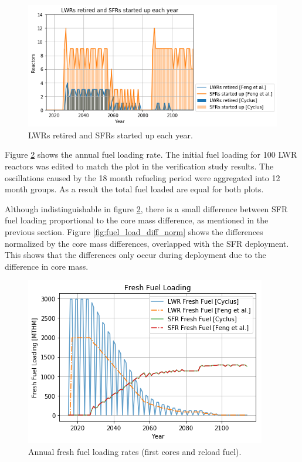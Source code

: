 \begin{figure}[htbp!]
	\begin{center}
		\includegraphics[scale=0.5]{./images/results_18/dep.png}
	\end{center}
	\caption{\glspl{LWR} retired and \glspl{SFR} started up each year.}
	\label{fig:dep}
\end{figure}

Figure \ref{fig:fuel_load} shows the annual fuel loading rate.
The initial fuel loading for 100 \gls{LWR} reactors was edited to match
the plot in the verification
study results. The oscillations caused by the 18 month refueling period
were aggregated into 12 month groups. As a result the total fuel loaded
are equal for both plots.

Although indistinguishable in figure \ref{fig:fuel_load},
there is a small difference between \gls{SFR} fuel loading proportional
to the core mass difference, as mentioned in the previous section.
Figure \ref{fig:fuel_load_diff_norm} shows the
differences normalized by the core mass differences, overlapped with the
\gls{SFR} deployment. This shows that the differences only occur during
deployment due to the difference in core mass.


\begin{figure}[htbp!]
	\begin{center}
		\includegraphics[scale=0.5]{./images/results_18/fuel_load.png}
	\end{center}
	\caption{Annual fresh fuel loading rates (first cores and reload fuel).}
	\label{fig:fuel_load}
\end{figure}

